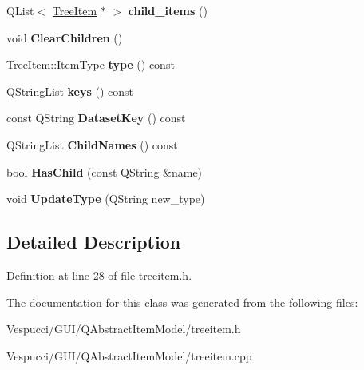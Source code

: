 \begin{DoxyCompactItemize}
\item 
Q\+List$<$ \hyperlink{class_tree_item}{Tree\+Item} $\ast$ $>$ {\bfseries child\+\_\+items} ()\hypertarget{class_tree_item_a6119a1b67f2da1a32057b42be6bcc2f9}{}\label{class_tree_item_a6119a1b67f2da1a32057b42be6bcc2f9}

\item 
void {\bfseries Clear\+Children} ()\hypertarget{class_tree_item_a26d8ae454bdb99b1d738522dbf2b7cc6}{}\label{class_tree_item_a26d8ae454bdb99b1d738522dbf2b7cc6}

\item 
Tree\+Item\+::\+Item\+Type {\bfseries type} () const \hypertarget{class_tree_item_abe86d3e2513ece1852f5f2b3922f1590}{}\label{class_tree_item_abe86d3e2513ece1852f5f2b3922f1590}

\item 
Q\+String\+List {\bfseries keys} () const \hypertarget{class_tree_item_af2f9cbd05fc5c9224cea73f3c36555ca}{}\label{class_tree_item_af2f9cbd05fc5c9224cea73f3c36555ca}

\item 
const Q\+String {\bfseries Dataset\+Key} () const \hypertarget{class_tree_item_ab159ff136dc660bd37868e3bd4baf75b}{}\label{class_tree_item_ab159ff136dc660bd37868e3bd4baf75b}

\item 
Q\+String\+List {\bfseries Child\+Names} () const \hypertarget{class_tree_item_a105402b3ad5d3c8321bf67e2b5fdf81e}{}\label{class_tree_item_a105402b3ad5d3c8321bf67e2b5fdf81e}

\item 
bool {\bfseries Has\+Child} (const Q\+String \&name)\hypertarget{class_tree_item_a766489df6b0414151971504a22f0351e}{}\label{class_tree_item_a766489df6b0414151971504a22f0351e}

\item 
void {\bfseries Update\+Type} (Q\+String new\+\_\+type)\hypertarget{class_tree_item_a5c34c26745333573356e8e78361ec012}{}\label{class_tree_item_a5c34c26745333573356e8e78361ec012}

\end{DoxyCompactItemize}


\subsection{Detailed Description}


Definition at line 28 of file treeitem.\+h.



The documentation for this class was generated from the following files\+:\begin{DoxyCompactItemize}
\item 
Vespucci/\+G\+U\+I/\+Q\+Abstract\+Item\+Model/treeitem.\+h\item 
Vespucci/\+G\+U\+I/\+Q\+Abstract\+Item\+Model/treeitem.\+cpp\end{DoxyCompactItemize}
